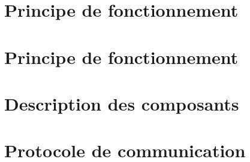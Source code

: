 \documentclass[11pt,a4paper]{report} %
\begin{document}
		\section{Principe de fonctionnement}		
		
		\section{Principe de fonctionnement}
		
		\section{Description des composants}
		
		
		
		\section{Protocole de communication}
		
		
		
\end{document}
